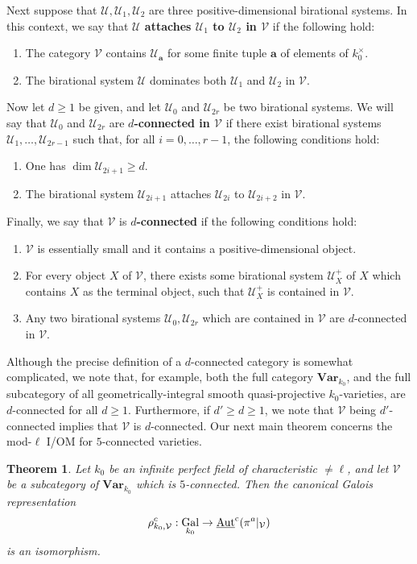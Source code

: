\documentclass[11pt]{amsart}
\newtheorem{maintheorem}{Theorem}
\theoremstyle{definition}
\theoremstyle{remark}
\numberwithin{equation}{section}
\DeclareMathOperator{\Aut}{Aut}
\DeclareMathOperator{\Gal}{Gal}
\newcommand{\Vc}{\mathcal{V}}
\newcommand{\Ucal}{\mathcal{U}}
\newcommand{\abf}{\mathbf{a}}
\newcommand{\UAutc}{\underline{\Aut}^{\rm c}}
\newcommand{\Var}{\mathbf{Var}}
\newcommand{\Galk}{{\Gal_{k_0}}}
\begin{document}
Next suppose that $\Ucal,\Ucal_1,\Ucal_2$ are three positive-dimensional birational systems.
In this context, we say that {\bf $\Ucal$ attaches $\Ucal_1$ to $\Ucal_2$ in $\Vc$} if the following hold:
\begin{enumerate}
  \item The category $\Vc$ contains $\Ucal_\abf$ for some finite tuple $\abf$ of elements of $k_0^\times$.
  \item The birational system $\Ucal$ dominates both $\Ucal_1$ and $\Ucal_2$ in $\Vc$.
\end{enumerate}

Now let $d \geq 1$ be given, and let $\Ucal_0$ and $\Ucal_{2r}$ be two birational systems.
We will say that $\Ucal_0$ and $\Ucal_{2r}$ are {\bf $d$-connected in $\Vc$} if there exist birational systems $\Ucal_1,\ldots,\Ucal_{2r-1}$ such that, for all $i = 0,\ldots,r-1$, the following conditions hold:
\begin{enumerate}
  \item One has $\dim \Ucal_{2i+1} \geq d$. 
  \item The birational system $\Ucal_{2i+1}$ attaches $\Ucal_{2i}$ to $\Ucal_{2i+2}$ in $\Vc$.
\end{enumerate}
Finally, we say that $\Vc$ is {\bf $d$-connected} if the following conditions hold:
\begin{enumerate}
  \item $\Vc$ is essentially small and it contains a positive-dimensional object.
  \item For every object $X$ of $\Vc$, there exists some birational system $\Ucal_X^+$ of $X$ which contains $X$ as the terminal object, such that $\Ucal_X^+$ is contained in $\Vc$.
  \item Any two birational systems $\Ucal_0,\Ucal_{2r}$ which are contained in $\Vc$ are $d$-connected in $\Vc$.
\end{enumerate}

Although the precise definition of a $d$-connected category is somewhat complicated, we note that, for example, both the full category $\Var_{k_0}$, and the full subcategory of all geometrically-integral smooth quasi-projective $k_0$-varieties, are $d$-connected for all $d \geq 1$.
Furthermore, if $d' \geq d \geq 1$, we note that $\Vc$ being $d'$-connected implies that $\Vc$ is $d$-connected.
Our next main theorem concerns the mod-$\ell$ I/OM for $5$-connected varieties.

\begin{maintheorem}
\label{maintheorem: intro / main-result / iom-main-connected}
  Let $k_0$ be an infinite perfect field of characteristic $\neq \ell$, and let $\Vc$ be a subcategory of $\Var_{k_0}$ which is $5$-connected.
  Then the canonical Galois representation 
  \[ \rho^c_{k_0,\Vc} : \Galk \rightarrow \UAutc(\pi^a|_\Vc) \]
  is an isomorphism.
\end{maintheorem}
\end{document}
